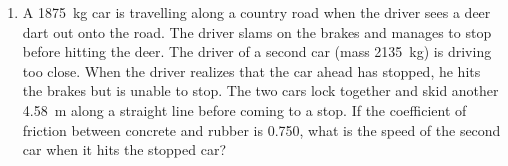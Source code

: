 \begin{enumerate}[itemsep=6pt]
%
%
%  
  
\item A \SI{1875}{\kilo\gram} car is travelling along a country road when the
  driver sees a deer dart out onto the road. The driver slams on the brakes
  and manages to stop before hitting the deer. The driver of a second car (mass
  \SI{2135}{\kilo\gram}) is driving too close. When the driver realizes that
  the car ahead has stopped, he hits the brakes but is unable to stop. The two
  cars lock together and skid another \SI{4.58}{\metre} along a straight line
  before coming to a stop. If the coefficient of friction between concrete and
  rubber is 0.750, what is the speed of the second car when it hits the stopped
  car?


\end{enumerate}
